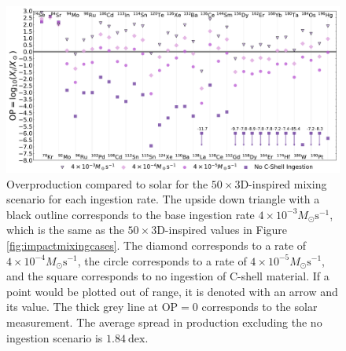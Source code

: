 \begin{figure}[!htbp]
\includegraphics[width=\textwidth]{chapters/2/figures/ingest_50x3D.pdf}
\caption{Overproduction compared to solar for the $50\times$3D-inspired mixing scenario for each ingestion rate. The upside down triangle with a black outline corresponds to the base ingestion rate $4\times10^{-3}M_\odot\mathrm{s^{-1}}$, which is the same as the $50\times$3D-inspired values in Figure \ref{fig:impactmixingcases}. The diamond corresponds to a rate of $4\times10^{-4}M_\odot\mathrm{s^{-1}}$, the circle corresponds to a rate of $4\times10^{-5}M_\odot\mathrm{s^{-1}}$, and the square corresponds to no ingestion of C-shell material. If a point would be plotted out of range, it is denoted with an arrow and its value. The thick grey line at $\mathrm{OP}=0$ corresponds to the solar measurement. The average spread in production excluding the no ingestion scenario is $1.84~\mathrm{dex}$.
\label{fig:ingest_50x3D}}
\end{figure}

